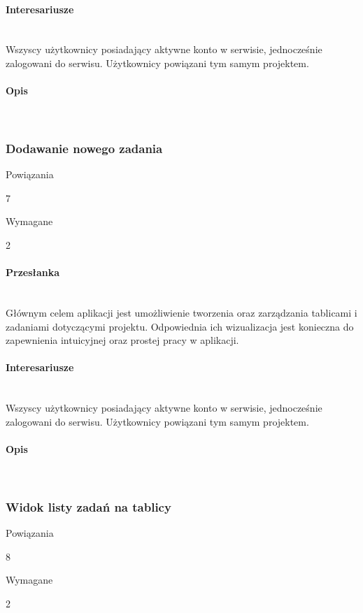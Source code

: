 \documentclass[eng,printmode]{mgr}
\begin{document}
\paragraph{Interesariusze}\ \\
Wszyscy użytkownicy posiadający aktywne konto w serwisie, jednocześnie zalogowani do serwisu. Użytkownicy powiązani tym samym projektem.

\paragraph{Opis}\ \\
\newpage

\subsubsection{Dodawanie nowego zadania}
\begin{labeling}{Powiązania}
\item [ID:] 7
\item [Typ:] Wymagane
\item [Powiązania] 2
\end{labeling}

\paragraph{Przesłanka}\ \\
Głównym celem aplikacji jest umożliwienie tworzenia oraz zarządzania tablicami i zadaniami dotyczącymi projektu. Odpowiednia ich wizualizacja jest konieczna do zapewnienia intuicyjnej oraz prostej pracy w aplikacji.

\paragraph{Interesariusze}\ \\
Wszyscy użytkownicy posiadający aktywne konto w serwisie, jednocześnie zalogowani do serwisu. Użytkownicy powiązani tym samym projektem.

\paragraph{Opis}\ \\
\newpage

\subsubsection{Widok listy zadań na tablicy}
\begin{labeling}{Powiązania}
\item [ID:] 8
\item [Typ:] Wymagane
\item [Powiązania] 2
\end{labeling}
\end{document}
